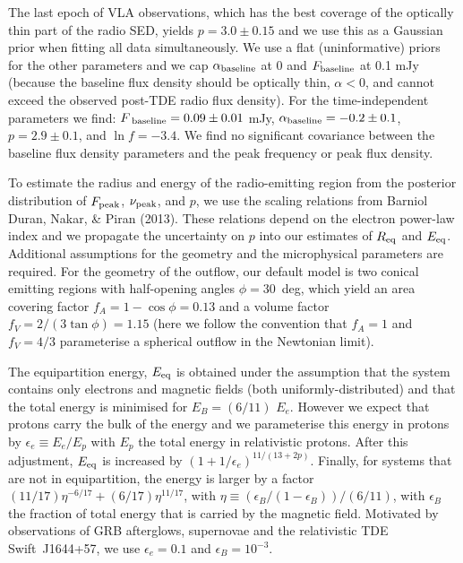 \documentclass{nature_plusfigure}
\begin{document}
\begin{methods}
The last epoch of VLA observations, which has the best coverage of the optically thin part of the radio SED, yields $p=3.0 \pm 0.15$ and we use this as a Gaussian prior when fitting all data simultaneously.  We use a flat (uninformative) priors for the other parameters and we cap $\alpha_{\textup{baseline}}$ at 0 and $F_{\textup{baseline}}$ at 0.1 mJy (because the baseline flux density should be optically thin, $\alpha < 0$, and cannot exceed the observed post-TDE radio flux density). For the time-independent parameters we find: $F_{\textup{ baseline}}=0.09\pm 0.01$ mJy, $\alpha_{\textup{baseline}} = -0.2\pm 0.1$, $p = 2.9 \pm 0.1$, and $\ln f=-3.4$. We find no significant covariance between the baseline flux density parameters and the peak frequency or peak flux density. 

To estimate the radius and energy of the radio-emitting region from the posterior distribution of $F_{\rm peak}$, $\nu_{\rm peak}$, and $p$, we use the scaling relations from {Barniol Duran}, {Nakar}, \& {Piran} (2013)\cite{2013ApJ...772...78B}. These relations depend on the electron power-law index and we propagate the uncertainty on $p$ into our estimates of $R_{\rm eq}$ and $E_{\rm eq}$. Additional assumptions for the geometry and the microphysical parameters are required. For the geometry of the outflow, our default model is two conical emitting regions with half-opening angles $\phi=$30~deg, which yield an area covering factor $f_A=1-\cos \phi=0.13$ and a volume factor $f_V=2/(3\tan \phi )=1.15$ (here we follow the convention\cite{2013ApJ...772...78B} that $f_A=1$ and $f_V=4/3$ parameterise a spherical outflow in the Newtonian limit). 

The equipartition energy, $E_{\rm eq}$ is obtained under the assumption that the system contains only electrons and magnetic fields (both uniformly-distributed) and that the total energy is minimised for $E_{B} = (6/11)$ $E_{e}$. However we expect that protons carry the bulk of the energy and we parameterise this energy in protons by $\epsilon_e \equiv E_e/E_p$ with $E_p$ the total energy in relativistic protons.  After this adjustment, $E_{\rm eq}$ is increased by $(1+1/\epsilon_e)^{11/(13+2p)}$. Finally, for systems that are not in equipartition, the energy is larger by a factor\cite{2013ApJ...772...78B} $(11/17) \eta^{-6/17} + (6/17) \eta^{11/17}$, with $\eta\equiv (\epsilon_B/(1-\epsilon_B))/(6/11)$, with $\epsilon_B$ the fraction of total energy that is carried by the magnetic field. Motivated by observations of GRB afterglows\cite{Granot14,Fong15}, supernovae\cite{2013MNRAS.436.1258H} and the relativistic TDE Swift~J1644+57\cite{2018ApJ...854...86E}, we use $\epsilon_e=0.1$ and $\epsilon_B=10^{-3}$. %


\end{methods}
\end{document}
